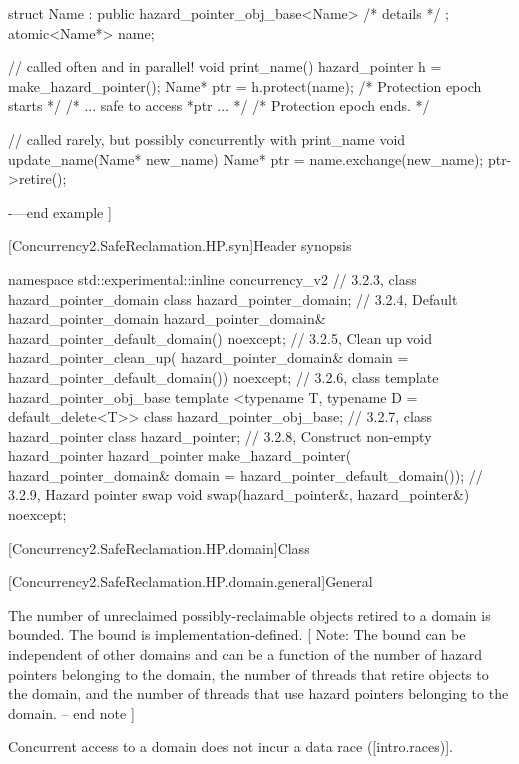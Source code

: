 \begin{codeblock}
struct Name : public hazard_pointer_obj_base<Name> { /* details */ };
atomic<Name*> name;

// called often and in parallel!
void print_name() {
  hazard_pointer h = make_hazard_pointer();
  Name* ptr = h.protect(name); /* Protection epoch starts */
  /* ... safe to access *ptr ... */
} /* Protection epoch ends. */

// called rarely, but possibly concurrently with print_name
void update_name(Name* new_name) {
  Name* ptr = name.exchange(new_name);
  ptr->retire();
}
\end{codeblock}
-—end example ]


[Concurrency2.SafeReclamation.HP.syn]{Header  synopsis}

\begin{codeblock}

namespace std::experimental::inline concurrency_v2 {
  // 3.2.3, class hazard_pointer_domain
  class hazard_pointer_domain;
  // 3.2.4, Default hazard_pointer_domain
  hazard_pointer_domain& hazard_pointer_default_domain() noexcept;
  // 3.2.5, Clean up
  void hazard_pointer_clean_up(
    hazard_pointer_domain& domain = hazard_pointer_default_domain())
    noexcept;
  // 3.2.6, class template hazard_pointer_obj_base
  template <typename T, typename D = default_delete<T>>
    class hazard_pointer_obj_base;
  // 3.2.7, class hazard_pointer
  class hazard_pointer;
  // 3.2.8, Construct non-empty hazard_pointer
  hazard_pointer make_hazard_pointer(
  hazard_pointer_domain& domain = hazard_pointer_default_domain());
  // 3.2.9, Hazard pointer swap
  void swap(hazard_pointer&, hazard_pointer&) noexcept;
}

\end{codeblock}

[Concurrency2.SafeReclamation.HP.domain]{Class }

[Concurrency2.SafeReclamation.HP.domain.general]{General}

\pnum
The number of unreclaimed possibly-reclaimable objects retired to a domain is bounded.
The bound is implementation-defined. [ Note: The bound can be independent of other
domains and can be a function of the number of hazard pointers belonging to the
domain, the number of threads that retire objects to the domain, and the number of
threads that use hazard pointers belonging to the domain. -- end note ]

\pnum
Concurrent access to a domain does not incur a data race ([intro.races)].

